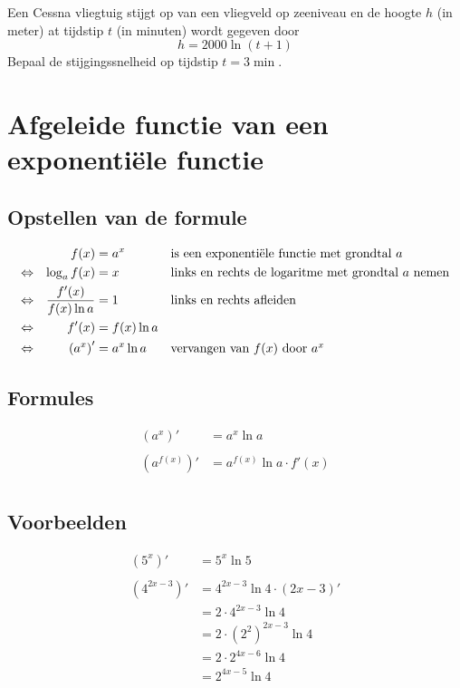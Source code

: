 \documentclass[12pt]{article}
\begin{document}
\begin{oefening}
Een Cessna vliegtuig stijgt op van een vliegveld op zeeniveau en de hoogte $h$ (in meter) at tijdstip $t$ (in minuten) wordt gegeven door
$$h=2000 \ln(t+1)$$
Bepaal de stijgingssnelheid op tijdstip $t=3\min$.
\end{oefening}
\vspace*{-1cm}

\pagebreak
\section{Afgeleide functie van een exponentiële functie}

\begin{theorie}

\subsection{Opstellen van de formule}

\begin{align*}
       && f(x) &= a^x && \mbox{is een exponentiële functie met grondtal $a$}\\
  \Leftrightarrow && \log_a f(x) &= x && \mbox{links en rechts de logaritme met grondtal $a$ nemen}\\
  \Leftrightarrow && \dfrac{f'(x)}{f(x)\ln a} &= 1 && \mbox{links en rechts afleiden}\\
  \Leftrightarrow && f'(x) &= f(x)\ln a\\
  \Leftrightarrow && \left(a^x\right)' &= a^x \ln a && \mbox{vervangen van $f(x)$ door $a^x$}
\end{align*}

\subsection{Formules}

\begin{align*}
  \left(a^x\right)' &= a^x \ln a\\\\
  \left(a^{f(x)}\right)' &= a^{f(x)} \ln a \cdot f'(x)\\
\end{align*}

\subsection{Voorbeelden}

\begin{align*}
\left(5^x\right)'      &= 5^x \ln 5\\\\
\left(4^{2x-3}\right)' &= 4^{2x-3} \ln 4 \cdot (2x-3)'\\
                       &= 2 \cdot 4^{2x-3} \ln 4\\
                       &= 2 \cdot \left(2^2\right)^{2x-3} \ln 4\\
                       &= 2 \cdot 2^{4x-6} \ln 4\\
                       &= 2^{4x-5} \ln 4\\
\end{align*}


\end{theorie}
\end{document}
